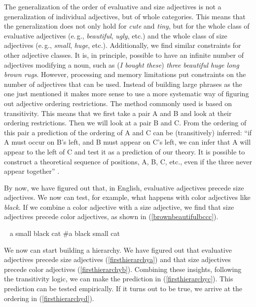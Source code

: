 \noindent The generalization of the order of evaluative and size adjectives is not a generalization of individual adjectives, but of whole categories. This means that the generalization does not only hold for \textit{cute} and \textit{tiny}, but for the whole class of evaluative adjectives (e.\,g., \textit{beautiful}, \textit{ugly}, etc.) and the whole class of size adjectives (e.\,g., \textit{small}, \textit{huge}, etc.). Additionally, we find similar constraints for other adjective classes. 
It is, in principle, possible to have an infinite number of adjectives modifying a noun, such as (\textit{I bought these}) \textit{three beautiful huge long brown rugs}. However, processing and memory limitations put constraints on the number of adjectives that can be used. Instead of building large phrases as the one just mentioned it makes more sense to use a more systematic way of figuring out adjective ordering restrictions. The method commonly used is based on transitivity. This means that we first take a pair A and B and look at their ordering restrictions. Then we will look at a pair B and C. From the ordering of this pair a prediction of the ordering of A and C can be (transitively) inferred: ``if A must occur on B's left, and B must appear on C's left, we can infer that A will appear to the left of C and test it as a prediction of our theory. It is possible to construct a theoretical sequence of positions, A, B, C, etc., even if the three never appear together'' \citep[42]{beninca2001position}.


By now, we have figured out that, in English, evaluative adjectives precede size adjectives. We now can test, for example, what happens with color adjectives like \textit{black}. If we combine a color adjective with a size adjective, we find that size adjectives precede color adjectives, as shown in (\ref{brownbeautifulbccc}).

\begin{exe}
\ex\label{brownbeautifulbccc}\begin{xlist} 
\ex \textcolor{white}{\#}a small black cat \label{ex:brownbeautifulba} 
\ex \#{a black small cat \label{ex:brownbeautifulbb} }
\end{xlist}
\end{exe}

\noindent We now can start building a hierarchy. We have figured out that evaluative adjectives precede size adjectives (\ref{firsthierarchya}) and that size adjectives precede color adjectives (\ref{firsthierarchyb}). Combining these insights, following the transitivity logic, we can make the prediction in (\ref{firsthierarchyc}). This prediction can be tested empirically. If it turns out to be true, we arrive at the ordering in (\ref{firsthierarchyd}).


